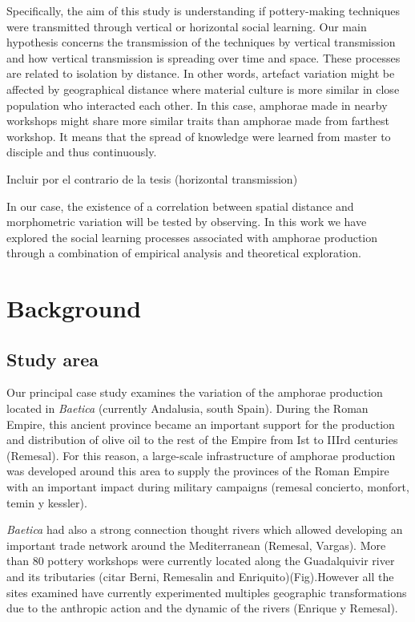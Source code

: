 \documentclass[review]{elsarticle}
\begin{document}
Specifically, the aim of this study is understanding if pottery-making techniques were transmitted through vertical or horizontal social learning. Our main hypothesis concerns the transmission of the techniques by vertical transmission and how vertical transmission is spreading over time and space. These processes are related to isolation by distance. In other words, artefact variation might be affected by geographical distance where material culture is more similar in close population who interacted each other. In this case, amphorae made in nearby workshops might share more similar traits than amphorae made from farthest workshop. It  means that the spread of knowledge were learned from master to disciple and thus continuously. 


Incluir por el contrario de la tesis (horizontal transmission)


In our case, the existence of a correlation between spatial distance and morphometric variation will be tested by observing. In this work we have explored the social learning processes associated with amphorae production through a combination of empirical analysis and theoretical exploration.





\section{Background}

\subsection{Study area}

Our principal case study examines the variation of the amphorae production located in \emph{Baetica} (currently Andalusia, south Spain). During the Roman Empire, this ancient province became an important support for the production and distribution of  olive oil to the rest of the Empire from Ist to IIIrd centuries (Remesal). 
For this reason, a large-scale infrastructure of amphorae production was developed around this area to supply the provinces of the Roman Empire with an important impact during military campaigns (remesal concierto, monfort, temin y kessler).

\emph{Baetica} had also a strong connection thought rivers which allowed developing an important trade network around the Mediterranean (Remesal, Vargas). More than 80 pottery workshops were currently located along the Guadalquivir river and its tributaries (citar Berni, Remesalin and Enriquito)(Fig).However all the sites examined have currently experimented multiples geographic transformations due to the anthropic action and the dynamic of the rivers (Enrique y Remesal). 
\end{document}
